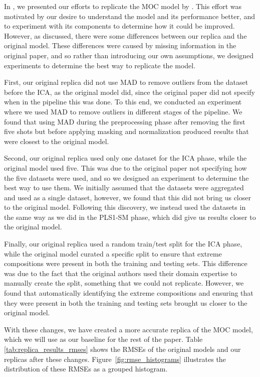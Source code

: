 In \citet{p9_paper}, we presented our efforts to replicate the MOC model by \citet{cleggRecalibrationMarsScience2017}.
This effort was motivated by our desire to understand the model and its performance better, and to experiment with its components to determine how it could be improved.
However, as discussed, there were some differences between our replica and the original model.
These differences were caused by missing information in the original paper, and so rather than introducing our own assumptions, we designed experiments to determine the best way to replicate the model.

First, our original replica did not use \gls{MAD} to remove outliers from the dataset before the \gls{ICA}, as the original model did, since the original paper did not specify when in the pipeline this was done.
To this end, we conducted an experiment where we used \gls{MAD} to remove outliers in different stages of the pipeline.
We found that using \gls{MAD} during the preprocessing phase after removing the first five shots but before applying masking and normalization produced results that were closest to the original model.

Second, our original replica used only one dataset for the \gls{ICA} phase, while the original model used five.
This was due to the original paper not specifying how the five datasets were used, and so we designed an experiment to determine the best way to use them.
We initially assumed that the datasets were aggregated and used as a single dataset, however, we found that this did not bring us closer to the original model.
Following this discovery, we instead used the datasets in the same way as we did in the \gls{PLS1-SM} phase, which did give us results closer to the original model.

Finally, our original replica used a random train/test split for the \gls{ICA} phase, while the original model curated a specific split to ensure that extreme compositions were present in both the training and testing sets.
This difference was due to the fact that the original authors used their domain expertise to manually create the split, something that we could not replicate.
However, we found that automatically identifying the extreme compositions and ensuring that they were present in both the training and testing sets brought us closer to the original model.

With these changes, we have created a more accurate replica of the MOC model, which we will use as our baseline for the rest of the paper.
Table \ref{tab:replica_results_rmses} shows the RMSEs of the original models and our replicas after these changes.
Figure~\ref{fig:rmse_histograms} illustrates the distribution of these RMSEs as a grouped histogram.

